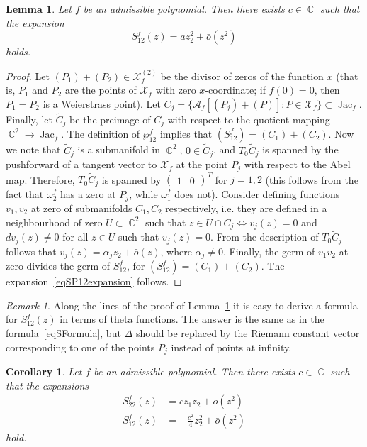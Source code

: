 \documentclass{amsart}
\numberwithin{equation}{section}
\newtheorem{lemma}[theorem]{Lemma}
\newtheorem{corollary}[theorem]{Corollary}
\theoremstyle{definition}
\theoremstyle{remark}
\newtheorem*{remark}{Remark}
\DeclareMathOperator{\Jac}{Jac}
\DeclareMathOperator{\CC}{\mathbb C}
\begin{document}
	\begin{lemma}\label{lemSP12expansion}
		Let $f$ be an admissible polynomial. Then there exists $c \in \CC$ such that the expansion
		\begin{equation}\label{eqSP12expansion}
			S_{12}^f(z) = az_2^2 + \bar{o}(z^2)
		\end{equation}
		holds.
	\end{lemma}
	\begin{proof}
		Let $(P_1) + (P_2) \in \mathcal X_f^{(2)}$ be the divisor of zeros of the function $x$ (that is, $P_1$ and $P_2$ are the points of $\mathcal X_f$ with zero $x$-coordinate; if $f(0) = 0$, then $P_1 = P_2$ is a Weierstrass point). Let $C_j = \{\mathscr A_f[(P_j) + (P)]: P \in \mathcal X_f\} \subset \Jac_f$. Finally, let $\tilde C_j$ be the preimage of $C_j$ with respect to the quotient mapping $\CC^2 \to \Jac_f$. The definition of $\wp_{12}^f$ implies that $\left(S_{12}^f\right) = (C_1) + (C_2)$. Now we note that $\tilde C_j$ is a submanifold in $\CC^2$, $0 \in \tilde C_j$, and $T_0\tilde C_j$ is spanned by the pushforward of a tangent vector to $\mathcal X_f$ at the point $P_j$ with respect to the Abel map. Therefore, $T_0 \tilde C_j$ is spanned by $\begin{pmatrix} 1 & 0 \end{pmatrix}^T$ for $j = 1,2$ (this follows from the fact that $\omega_2^f$ has a zero at $P_j$, while $\omega_1^f$ does not). Consider defining functions $v_1, v_2$ at zero of submanifolds $C_1,C_2$ respectively, i.e. they are defined in a neighbourhood of zero $U \subset \CC^2$ such that $z \in U \cap C_j \Leftrightarrow v_j(z) = 0$ and $dv_j(z) \ne 0$ for all $z \in U$ such that $v_j(z) = 0$. From the description of $T_0\tilde C_j$ follows that $v_j(z) = \alpha_j z_2 + \bar{o}(z)$, where $\alpha_j \ne 0$. Finally, the germ of $v_1v_2$ at zero divides the germ of $S_{12}^f$, for $(S_{12}^f) = (C_1) + (C_2)$. The expansion~\eqref{eqSP12expansion} follows.
	\end{proof}
	\begin{remark}
		Along the lines of the proof of Lemma~\ref{lemSP12expansion} it is easy to derive a formula for $S_{12}^f(z)$ in terms of theta functions. The answer is the same as in the formula~\eqref{eqSFormula}, but $\Delta$ should be replaced by the Riemann constant vector corresponding to one of the points $P_j$ instead of points at infinity.
	\end{remark}
	\begin{corollary}\label{corPartialExpansions}
		Let $f$ be an admissible polynomial. Then there exists $c \in \CC$ such that the expansions
		\begin{equation}\label{eqSP12and22expansion}
			\begin{split}
				S_{22}^f(z) & =  cz_1z_2 + \bar{o}(z^2) \\
				S_{12}^f(z) & =  -\frac{c^2}{4}z_2^2 + \bar{o}(z^2)
			\end{split}
		\end{equation}
		hold.
	\end{corollary}
\end{document}
